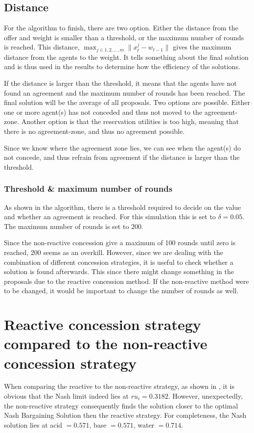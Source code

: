 \subsection{Distance}
For the algorithm  to finish, there are two option. Either the distance from the offer and weight is smaller than a threshold, or the maximum number of rounds is reached. This distance, $ \displaystyle\max_{ j \in {1,2,...,m}} \parallel x^j_t-w_{t-1} \parallel$ gives the maximum distance from the agents to the weight. It tells something about the final solution and is thus used in the results to determine how the efficiency of the solutions. 

If the distance is larger than the threshold, it means that the agents have not found an agreement and the maximum number of rounds has been reached. The final solution will be the average of all proposals. Two options are possible. Either one or more agent(s) has not conceded and thus not moved to the agreement-zone. Another option is that the reservation utilities is too high, meaning that there is no agreement-zone, and thus no agreement possible. 

Since we know where the agreement zone lies, we can see when the agent(s) do not concede, and thus refrain from agreement if the distance is larger than the threshold.


\subsubsection{Threshold \& maximum number of rounds}
As shown in the algorithm, there is a threshold required to decide on the value and whether an agreement is reached. For this simulation this is set to $\delta = 0.05$.	The maximum number of rounds is set to $200$.

Since the non-reactive concession give a maximum of 100 rounds until zero is reached, 200 seems as an overkill. However, since we are dealing with the combination of different concession strategies, it is useful to check whether a solution is found afterwards. This since there might change something in the proposals due to the reactive concession method. If the non-reactive method were to be changed, it would be important to change the number of rounds as well. 

\section{Reactive concession strategy compared to the non-reactive concession strategy}
When comparing the reactive to the non-reactive strategy, as shown in , it is obvious that the Nash limit indeed lies at $ru_i = 0.3182$. However, unexpectedly, the non-reactive strategy consequently finds the solution closer to the optimal Nash Bargaining Solution then the reactive strategy. For completeness, the Nash solution lies at acid $= 0.571$, base $= 0.571$, water $= 0.714$.

